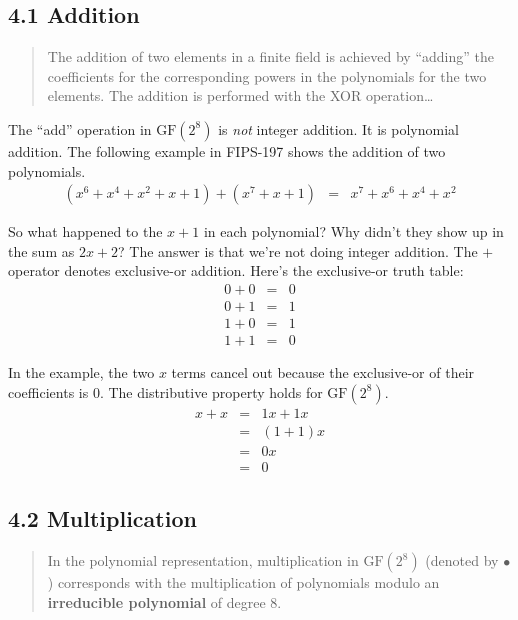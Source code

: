 \documentclass{article}
\newcommand{\GF}{\mathrm{GF}(2^8)}
\newcommand{\gfmul}{\bullet}
\begin{document}
\newpage
\subsection*{4.1 Addition}

\begin{quote}
  The addition of two elements in a finite field is achieved by ``adding''
  the coefficients for the corresponding powers in the polynomials for the 
  two elements.  The addition is performed with the XOR operation\ldots
\end{quote}

The ``add'' operation in $\GF$ is \emph{not} integer addition.
It is polynomial addition.
The following example in FIPS-197 shows the addition of two polynomials.
\begin{eqnarray*}
 (x^6+x^4+x^2+x+1) + (x^7+x+1) &=& x^7 + x^6 + x^4 + x^2
\end{eqnarray*}

So what happened to the $x+1$ in each polynomial?
Why didn't they show up in the sum as $2x+2$?
The answer is that we're not doing integer addition.
The $+$ operator denotes exclusive-or addition.
Here's the exclusive-or truth table:
\begin{eqnarray*}
  0 + 0 &=& 0 \\
  0 + 1 &=& 1 \\
  1 + 0 &=& 1 \\
  1 + 1 &=& 0
\end{eqnarray*}

In the example, the two $x$ terms cancel out because
the exclusive-or of their coefficients is 0.
The distributive property holds for $\GF$.
\begin{eqnarray*}
  x + x &=& 1 x + 1 x \\
  &=& (1+1) x \\
  &=& 0 x \\
  &=& 0
\end{eqnarray*}


\subsection*{4.2 Multiplication}

\begin{quote}
  In the polynomial representation, multiplication in $\GF$ 
  (denoted by $\gfmul$) corresponds with the multiplication 
  of polynomials modulo an \textbf{irreducible polynomial}
  of degree 8.
\end{quote}
\end{document}
